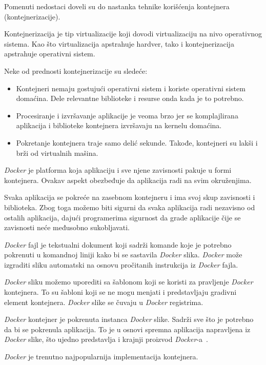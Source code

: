 Pomenuti nedostaci doveli su do nastanka tehnike korišćenja kontejnera (kontejnerizacije). 

Kontejnerizacija je tip virtualizacije koji dovodi virtualizaciju na nivo operativnog 
sistema. Kao što virtualizacija apstrahuje hardver, tako i kontejnerizacija apstrahuje 
operativni sistem.

Neke od prednosti kontejnerizacije su sledeće:
\begin{itemize}
    \item Kontejneri nemaju gostujući operativni sistem i koriste operativni sistem domaćina. 
    Dele relevantne biblioteke i resurse onda kada je to potrebno.
    \item Procesiranje i izvršavanje aplikacije je veoma brzo jer se komplajlirana aplikacija 
    i biblioteke kontejnera izvršavaju na kernelu domaćina.
    \item Pokretanje kontejnera traje samo delić sekunde. Takođe, kontejneri su lakši i brži 
    od virtualnih mašina.
\end{itemize}

\textit{Docker} je platforma koja aplikaciju i sve njene zavisnosti pakuje u formi kontejnera. 
Ovakav aspekt obezbeđuje da aplikacija radi na svim okruženjima.

Svaka aplikacija se pokreće na zasebnom kontejneru i ima svoj skup zavisnosti i biblioteka. 
Zbog toga možemo biti sigurni da svaka aplikacija radi nezavisno od ostalih aplikacija, 
dajući programerima sigurnost da grade aplikacije čije se zavisnosti neće međusobno sukobljavati.

\textit{Docker} fajl je tekstualni dokument koji sadrži komande koje je potrebno pokrenuti 
u komandnoj liniji kako bi se sastavila \textit{Docker} slika. \textit{Docker} može izgraditi sliku automatski 
na osnovu pročitanih instrukcija iz \textit{Docker} fajla.

\textit{Docker} sliku možemo uporediti sa šablonom koji se koristi za pravljenje \textit{Docker} kontejnera. 
To su šabloni koji se ne mogu menjati i predstavljaju gradivni element kontejnera.
\textit{Docker} slike se čuvaju u \textit{Docker} registrima. 

\textit{Docker} kontejner je pokrenuta instanca \textit{Docker} slike. Sadrži sve što je potrebno da bi se 
pokrenula aplikacija. To je u osnovi spremna aplikacija napravljena iz \textit{Docker} slike, 
što ujedno predstavlja i krajnji proizvod \textit{Docker}-a~\cite{docker}.

\textit{Docker} je trenutno najpopularnija implementacija kontejnera.

